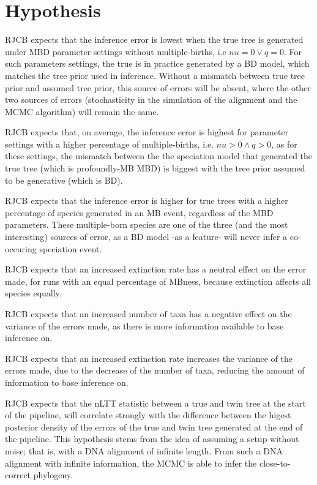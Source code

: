 \section{Hypothesis}



RJCB expects that the inference error is lowest when the true
tree is generated under MBD parameter settings without multiple-births, i.e
$nu = 0 \vee q = 0$. For such parameters settings, the
true is in practice generated by a BD model, which
matches the tree prior used in inference. Without a mismatch between
true tree prior and assumed tree prior, this source of errors will be absent,
where the other two sources of errors (stochasticity in the
simulation of the alignment and the MCMC algorithm) 
will remain the same.

RJCB expects that, on average, the inference error is highest for
parameter settings with a higher percentage of multiple-births,
i.e. $nu > 0 \wedge q > 0$, as for these settings, 
the mismatch between the the speciation model that
generated the true tree (which is profoundly-MB MBD) is biggest with
the tree prior assumed to be generative (which is BD).

RJCB expects that the inference error is higher for true trees
with a higher percentage of species generated in an MB event,
regardless of the MBD parameters.
These multiple-born species are one of the three (and the most 
interesting) sources of error, as a BD model -as a feature- will never
infer a co-occuring speciation event.

RJCB expects that an increased extinction rate
has a neutral effect on the error made, 
for runs with an equal percentage of MBness,
because extinction affects all species equally. 

RJCB expects that an increased number of taxa
has a negative effect on the variance of the errors made, as there
is more information available to base inference on.

RJCB expects that an increased extinction rate
increases the variance of the errors made,
due to the decrease of the number of taxa, reducing the amount of information
to base inference on.

RJCB expects that the nLTT statistic between a true and twin
tree at the start of the pipeline,
will correlate strongly with the difference
between the higest posterior density of the 
errors of the true and twin tree 
generated at the end of the pipeline. 
This hypothesis
stems from the idea of assuming a setup without noise; that is, with
a DNA alignment of infinite length. From such a DNA alignment 
with infinite information, the MCMC
is able to infer the close-to-correct phylogeny.

